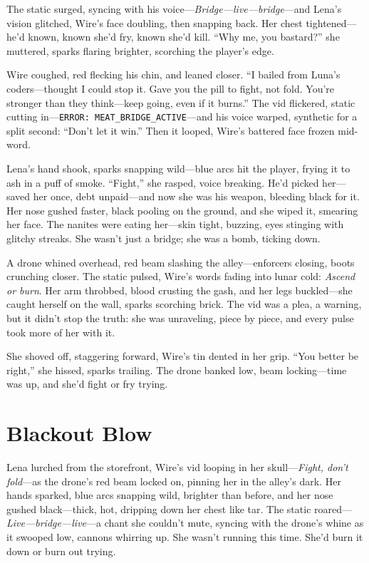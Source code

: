 \documentclass[12pt]{book}
\begin{document}
The static surged, syncing with his voice---\textit{Bridge---live---bridge}---and Lena’s vision glitched, Wire’s face doubling, then snapping back. Her chest tightened---he’d known, known she’d fry, known she’d kill. ``Why me, you bastard?'' she muttered, sparks flaring brighter, scorching the player’s edge.

Wire coughed, red flecking his chin, and leaned closer. ``I bailed from Luna’s coders---thought I could stop it. Gave you the pill to fight, not fold. You’re stronger than they think---keep going, even if it burns.'' The vid flickered, static cutting in---\texttt{ERROR: MEAT\_BRIDGE\_ACTIVE}---and his voice warped, synthetic for a split second: ``Don’t let it win.'' Then it looped, Wire’s battered face frozen mid-word.

Lena’s hand shook, sparks snapping wild---blue arcs hit the player, frying it to ash in a puff of smoke. ``Fight,'' she rasped, voice breaking. He’d picked her---saved her once, debt unpaid---and now she was his weapon, bleeding black for it. Her nose gushed faster, black pooling on the ground, and she wiped it, smearing her face. The nanites were eating her---skin tight, buzzing, eyes stinging with glitchy streaks. She wasn’t just a bridge; she was a bomb, ticking down.

A drone whined overhead, red beam slashing the alley---enforcers closing, boots crunching closer. The static pulsed, Wire’s words fading into lunar cold: \textit{Ascend or burn}. Her arm throbbed, blood crusting the gash, and her legs buckled---she caught herself on the wall, sparks scorching brick. The vid was a plea, a warning, but it didn’t stop the truth: she was unraveling, piece by piece, and every pulse took more of her with it.

She shoved off, staggering forward, Wire’s tin dented in her grip. ``You better be right,'' she hissed, sparks trailing. The drone banked low, beam locking---time was up, and she’d fight or fry trying.

\section{Blackout Blow}

Lena lurched from the storefront, Wire’s vid looping in her skull---\textit{Fight, don’t fold}---as the drone’s red beam locked on, pinning her in the alley’s dark. Her hands sparked, blue arcs snapping wild, brighter than before, and her nose gushed black---thick, hot, dripping down her chest like tar. The static roared---\textit{Live---bridge---live}---a chant she couldn’t mute, syncing with the drone’s whine as it swooped low, cannons whirring up. She wasn’t running this time. She’d burn it down or burn out trying.
\end{document}

